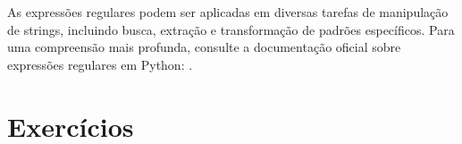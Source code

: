 \documentclass[letterpaper,10pt,english]{jupyterBook}
\begin{document}
\begin{sphinxVerbatim}[commandchars=\\\{\}]
      
      
\end{sphinxVerbatim}

\sphinxAtStartPar
As expressões regulares podem ser aplicadas em diversas tarefas de manipulação de strings, incluindo busca, extração e transformação de padrões específicos. Para uma compreensão mais profunda, consulte a documentação oficial sobre expressões regulares em Python: .


\section{Exercícios}
\end{document}
